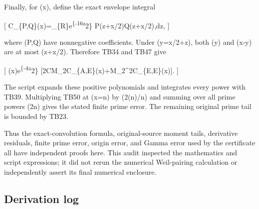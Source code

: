 \documentclass[
]{article}
\begin{document}
Finally, for (x), define the exact envelope integral

{[}
\mathcal C\_\{P,Q\}(x)=\int\_\{\mathbb R\}e\textsuperscript{\{-16z}2\}
P(\textbar z\textbar+x/2)Q(\textbar z\textbar+x/2),dz, {]}

where (P,Q) have nonnegative coefficients. Under (y=x/2+z), both
(\textbar y\textbar) and (\textbar x-y\textbar) are at most
(\textbar z\textbar+x/2). Therefore TB34 and TB47 give

{[} \textbar{}\Delta(x)\textbar{}\le e\textsuperscript{\{-4x}2\}
{[}2CM\_2\mathcal C\_\{A,E\}(x)+M\_2\^{}2\mathcal C\_\{E,E\}(x){]}.
 {]}

The script expands these positive polynomials and integrates every power
with TB39. Multiplying TB50 at (x=\log n) by (2\Lambda(n)/\sqrt n) and
summing over all prime powers (2\le n) gives the stated finite
prime error. The remaining original prime tail is bounded by TB23.

Thus the exact-convolution formula, original-source moment tails,
derivative residuals, finite prime error, origin error, and Gamma error
used by the certificate all have independent proofs here. This audit
inspected the mathematics and script expressions; it did not rerun the
numerical Weil-pairing calculation or independently assert its final
numerical enclosure.

\subsection{Derivation log}\label{derivation-log}
\end{document}
